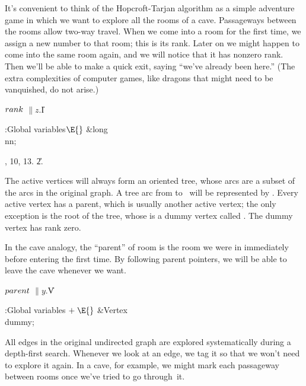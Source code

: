 It's convenient to think of the Hopcroft-Tarjan algorithm as a simple adventure
game in which we want to explore all the rooms of a cave. Passageways between
the rooms allow two-way travel. When we come
into a room for the first time, we assign a new number to that room;
this is its rank. Later on we might happen to come into the same room
again, and we will notice that it has nonzero rank. Then we'll be able
to make a quick exit, saying ``we've already been here.'' (The extra
complexities of computer games, like dragons that might need to be
vanquished, do not arise.)

\Y\B\4\D$\\{rank}$ \5
$\|z.{}$\|I\par
\Y\B\4:Global variables\X${}\E{}$\6
\&{long} \\{nn};\par
{}, 10, 13.
\U2.\fi

The active vertices will always form an oriented tree, whose arcs are
a subset of the arcs in the original graph. A tree arc from  to~
will be represented by . Every active vertex has a
parent, which is usually another active vertex; the only exception is
the root of the tree, whose  is a dummy vertex called .
The dummy vertex has rank zero.

In the cave analogy, the ``parent'' of room  is the room we were in
immediately before entering  the first time. By following parent
pointers, we will be able to leave the cave whenever we want.

\Y\B\4\D$\\{parent}$ \5
$\|y.{}$\|V\par
\Y\B\4:Global variables\X${}\mathrel+\E{}$\6
\&{Vertex} \\{dummy};\par
\fi

All edges in the original undirected graph are explored systematically
during
a depth-first search. Whenever we look at an edge, we tag it so that
we won't need to explore it again. In a cave, for example, we might
mark each passageway between rooms once we've tried to go through~it.

